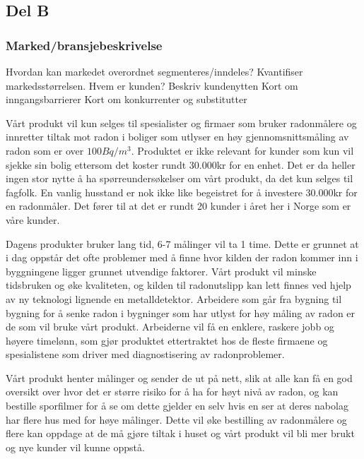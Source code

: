 \subsection{Del B}

\subsubsection{Marked/bransjebeskrivelse}

Hvordan kan markedet overordnet segmenteres/inndeles? Kvantifiser markedsstørrelsen. 
Hvem er kunden? Beskriv kundenytten 
Kort om inngangsbarrierer 
Kort om konkurrenter og substitutter 


Vårt produkt vil kun selges til spesialister og firmaer som bruker radonmålere og innretter tiltak mot radon i boliger som utlyser en høy gjennomsnittsmåling av radon som er over $100 Bq/m^3$. Produktet er ikke relevant for kunder som kun vil sjekke sin bolig ettersom det koster rundt 30.000kr for en enhet. Det er da heller ingen stor nytte å ha spørreundersøkelser om vårt produkt, da det kun selges til fagfolk. En vanlig husstand er nok ikke like begeistret for å investere 30.000kr for en radonmåler. Det fører til at det er rundt 20 kunder i året her i Norge som er våre kunder.  

Dagens produkter bruker lang tid, 6-7 målinger vil ta 1 time. Dette er grunnet at i dag oppstår det ofte problemer med å finne hvor kilden der radon kommer inn i byggningene ligger grunnet utvendige faktorer. Vårt produkt vil minske tidsbruken og øke kvaliteten, og kilden til radonutslipp kan lett finnes ved hjelp av ny teknologi lignende en metalldetektor. Arbeidere som går fra bygning til bygning for å senke radon i bygninger som har utlyst for høy måling av radon er de som vil bruke vårt produkt. Arbeiderne vil få en enklere, raskere jobb og høyere timelønn, som gjør produktet ettertraktet hos de fleste firmaene og spesialistene som driver med diagnostisering av radonproblemer. 

Vårt produkt henter målinger og sender de ut på nett, slik at alle kan få en god oversikt over hvor det er større risiko for å ha for høyt nivå av radon, og kan bestille sporfilmer for å se om dette gjelder en selv hvis en ser at deres nabolag har flere hus med for høye målinger. Dette vil øke bestilling av radonmålere og flere kan oppdage at de må gjøre tiltak i huset og vårt produkt vil bli mer brukt og nye kunder vil kunne oppstå. 

